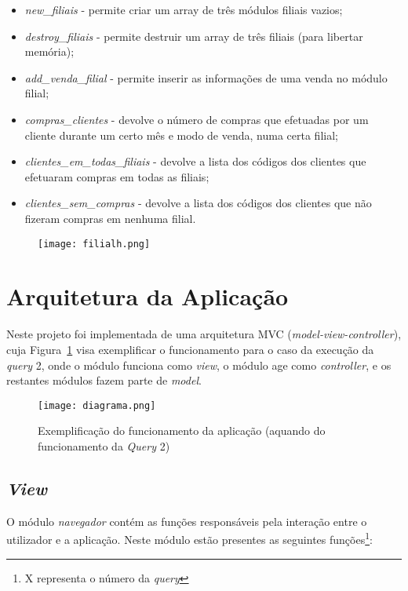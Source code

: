 \documentclass{article}
\begin{document}
\begin{itemize}

\item \textit{new\_filiais} - permite criar um array de três módulos filiais vazios;
\item \textit{destroy\_filiais} - permite destruir um array de três filiais (para libertar memória);
\item \textit{add\_venda\_filial} - permite inserir as informações de uma venda no módulo filial;
\item \textit{compras\_clientes} - devolve o número de compras que efetuadas por um cliente durante um certo mês e modo de venda, numa certa filial;
\item \textit{clientes\_em\_todas\_filiais} - devolve a lista dos códigos dos clientes que efetuaram compras em todas as filiais;
\item \textit{clientes\_sem\_compras} - devolve a lista dos códigos dos clientes que não fizeram compras em nenhuma filial.
\end{itemize}

\begin{figure}[H]
\texttt{[image: filialh.png]}
\centering
\end{figure}
\newpage


\section{Arquitetura da Aplicação}\label{sec:arqaplic}

Neste projeto foi implementada de uma arquitetura MVC (\textit{model-view-controller}), cuja Figura~\ref{fig:arq} visa exemplificar o funcionamento para o caso da execução da \textit{query} 2, onde o módulo {\selectfont{navegador}} funciona como \textit{view}, o módulo {\selectfont{interface}} age como \textit{controller}, e os restantes módulos fazem parte de \textit{model}.  

\begin{figure}[H]
\texttt{[image: diagrama.png]}
\centering
\caption{Exemplificação do funcionamento da aplicação (aquando do funcionamento da \textit{Query} 2)\label{fig:arq}}
\end{figure}

\subsection{\textit{View}}

O módulo \textit{navegador} contém as funções responsáveis pela interação entre o utilizador e a aplicação. Neste módulo estão presentes as seguintes funções\footnote{X representa o número da \textit{query}}: 
\end{document}
